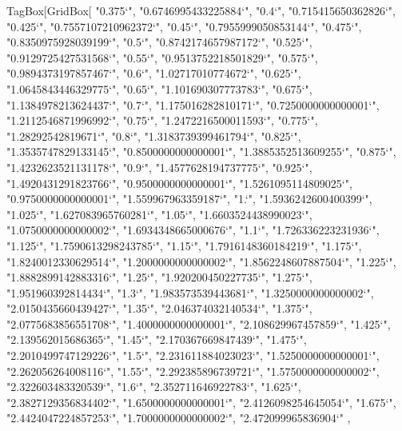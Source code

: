 
TagBox[GridBox[{
{"0.375`", "0.6746995433225884`"},
{"0.4`", "0.715415650362826`"},
{"0.425`", "0.7557107210962372`"},
{"0.45`", "0.7955999050853144`"},
{"0.475`", "0.8350975928039199`"},
{"0.5`", "0.8742174657987172`"},
{"0.525`", "0.9129725427531568`"},
{"0.55`", "0.9513752218501829`"},
{"0.575`", "0.9894373197857467`"},
{"0.6`", "1.02717010774672`"},
{"0.625`", "1.0645843446329775`"},
{"0.65`", "1.101690307773783`"},
{"0.675`", "1.1384978213624437`"},
{"0.7`", "1.175016282810171`"},
{"0.7250000000000001`", "1.2112546871996992`"},
{"0.75`", "1.2472216500011593`"},
{"0.775`", "1.28292542819671`"},
{"0.8`", "1.3183739399461794`"},
{"0.825`", "1.3535747829133145`"},
{"0.8500000000000001`", "1.3885352513609255`"},
{"0.875`", "1.4232623521131178`"},
{"0.9`", "1.4577628194737775`"},
{"0.925`", "1.4920431291823766`"},
{"0.9500000000000001`", "1.5261095114809025`"},
{"0.9750000000000001`", "1.559967963359187`"},
{"1.`", "1.5936242600400399`"},
{"1.025`", "1.627083965760281`"},
{"1.05`", "1.6603524438990023`"},
{"1.0750000000000002`", "1.6934348665000676`"},
{"1.1`", "1.726336223231936`"},
{"1.125`", "1.7590613298243785`"},
{"1.15`", "1.7916148360184219`"},
{"1.175`", "1.8240012330629514`"},
{"1.2000000000000002`", "1.8562248607887504`"},
{"1.225`", "1.8882899142883316`"},
{"1.25`", "1.920200450227735`"},
{"1.275`", "1.951960392814434`"},
{"1.3`", "1.983573539443681`"},
{"1.3250000000000002`", "2.0150435660439427`"},
{"1.35`", "2.046374032140534`"},
{"1.375`", "2.0775683856551708`"},
{"1.4000000000000001`", "2.108629967457859`"},
{"1.425`", "2.139562015686365`"},
{"1.45`", "2.170367669847439`"},
{"1.475`", "2.2010499747129226`"},
{"1.5`", "2.231611884023023`"},
{"1.5250000000000001`", "2.262056264008116`"},
{"1.55`", "2.292385896739721`"},
{"1.5750000000000002`", "2.322603483320539`"},
{"1.6`", "2.352711646922783`"},
{"1.625`", "2.3827129356834402`"},
{"1.6500000000000001`", "2.4126098254645054`"},
{"1.675`", "2.4424047224857253`"},
{"1.7000000000000002`", "2.472099965836904`"}
},
